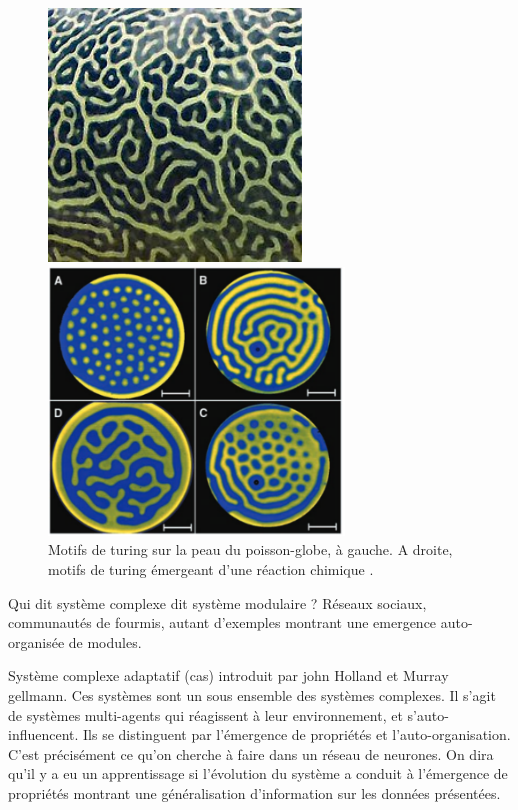\begin{figure}
\begin{minipage}{0.5\textwidth}
\centering
\includegraphics[width=0.6\textwidth]{220px-Giant_Pufferfish_skin_pattern_detail.jpg}
\end{minipage}
\begin{minipage}{0.5\textwidth}
\centering
\includegraphics[width=0.7\textwidth]{turing_pattern_chem.pdf}
\end{minipage}
\caption{Motifs de turing sur la peau du poisson-globe, à gauche. A droite, motifs de turing émergeant d'une réaction chimique \cite{Horvth2009AnED}.}
\label{fig:turing_pattern}
\end{figure}

Qui dit système complexe dit système modulaire ?
Réseaux sociaux, communautés de fourmis, autant d'exemples montrant une emergence auto-organisée de modules. 


Système complexe adaptatif (cas) introduit par john Holland et Murray gellmann.
Ces systèmes sont un sous ensemble des systèmes complexes. Il s'agit de systèmes multi-agents qui réagissent à leur environnement, et s'auto-influencent. Ils se distinguent par l'émergence de propriétés et l'auto-organisation. C'est précisément ce qu'on cherche à faire dans un réseau de neurones. On dira qu'il y a eu un apprentissage si l'évolution du système a conduit à l'émergence de propriétés montrant une généralisation d'information sur les données présentées. 



